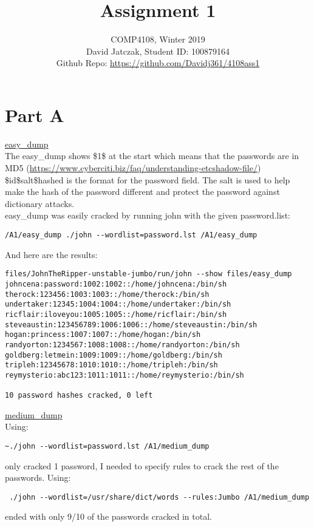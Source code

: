 \documentclass[12pt]{article}
\title{Assignment 1}
\author{COMP4108, Winter 2019 \\ David Jatczak, Student ID: 100879164 \\ Github Repo: \url{https://github.com/Davidj361/4108ass1}}
\begin{document}
\maketitle

\part*{Part A}

\underline{easy\_dump} \\

The easy\_dump shows \$1\$ at the start which means that the passwords are in MD5 (\url{https://www.cyberciti.biz/faq/understanding-etcshadow-file/}) \\
\$id\$salt\$hashed is the format for the password field.
The salt is used to help make the hash of the password different and protect the password against dictionary attacks. \\

easy\_dump was easily cracked by running john with the given password.list:
\begin{verbatim}
/A1/easy_dump ./john --wordlist=password.lst /A1/easy_dump
\end{verbatim}

And here are the results:

\begin{verbatim}
files/JohnTheRipper-unstable-jumbo/run/john --show files/easy_dump
johncena:password:1002:1002::/home/johncena:/bin/sh
therock:123456:1003:1003::/home/therock:/bin/sh
undertaker:12345:1004:1004::/home/undertaker:/bin/sh
ricflair:iloveyou:1005:1005::/home/ricflair:/bin/sh
steveaustin:123456789:1006:1006::/home/steveaustin:/bin/sh
hogan:princess:1007:1007::/home/hogan:/bin/sh
randyorton:1234567:1008:1008::/home/randyorton:/bin/sh
goldberg:letmein:1009:1009::/home/goldberg:/bin/sh
tripleh:12345678:1010:1010::/home/tripleh:/bin/sh
reymysterio:abc123:1011:1011::/home/reymysterio:/bin/sh

10 password hashes cracked, 0 left
\end{verbatim}

\underline{medium\_dump} \\

Using: \begin{verbatim}~./john --wordlist=password.lst /A1/medium_dump \end{verbatim} only cracked 1 password, I needed to specify rules to crack the rest of the passwords.
Using: \begin{verbatim} ./john --wordlist=/usr/share/dict/words --rules:Jumbo /A1/medium_dump \end{verbatim} ended with only 9/10 of the passwords cracked in total. \\
\end{document}
